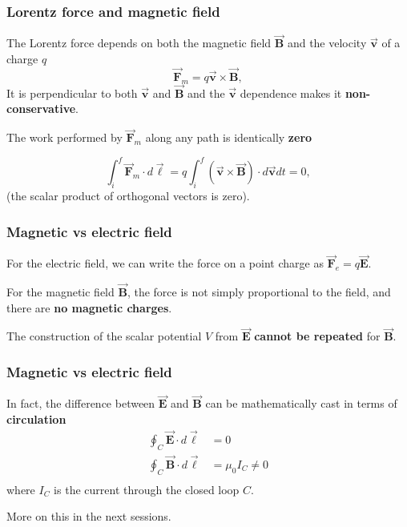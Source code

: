 \documentclass{beamer}
\makeatletter
\newcommand{\vc}[1]{\vec{\boldsymbol{#1}}}
\let\HL\hl
\renewcommand\hl{%
  \let\set@color\beamerorig@set@color
  \let\reset@color\beamerorig@reset@color
  \HL}
\makeatother
\begin{document}
\begin{frame}
\frametitle{Lorentz force and magnetic field}
\small
The Lorentz force depends on both the magnetic field $\vc{B}$ and the velocity $\vc{v}$ of a charge $q$
\begin{equation}
	\vc{F}_m=q \vc{v} \times \vc{B},
\end{equation}
It is perpendicular to both $\vc{v}$ and $\vc{B}$ and the $\vc{v}$ dependence makes it \textbf{non-conservative}.\newline


The work performed by $\vc{F}_m$  along any path is identically \textbf{zero}

\begin{equation}
	\int_i^f \vc{F}_m\cdot d\vc{\ell}=q\int_i^f  (\vc{v} \times \vc{B})\cdot d\vc{v}dt=0,
\end{equation}
(the scalar product of orthogonal vectors is zero).\newline
%
\end{frame}

\begin{frame}
	\frametitle{Magnetic vs electric field}

	For the electric field, we can write the force on a point charge as $\vc{F}_e = q\vc{E}$.\newline
	
	For the magnetic field $\vc{B}$, the force is not simply proportional to the field, and there are \textbf{no magnetic charges}.\newline 
	
	The construction of the scalar potential $V$ from $\vc{E}$ \textbf{cannot be repeated }for $\vc{B}$.\newline
	
	\end{frame}


\begin{frame}
\frametitle{Magnetic vs electric field}

	In fact, the difference between $\vc{E}$ and $\vc{B}$ can be mathematically cast in terms of \textbf{circulation}
	\begin{align}
		\oint_C \vc{E}\cdot d \vc{\ell}&=0\\
		\oint_C \vc{B}\cdot d \vc{\ell}&=\mu_0 I_C\neq0\\
	\end{align}
	where $I_C$ is the current through the closed loop $C$. \newline 
	
	More on this in the next sessions.\newline
	
	
\end{frame}
\end{document}
